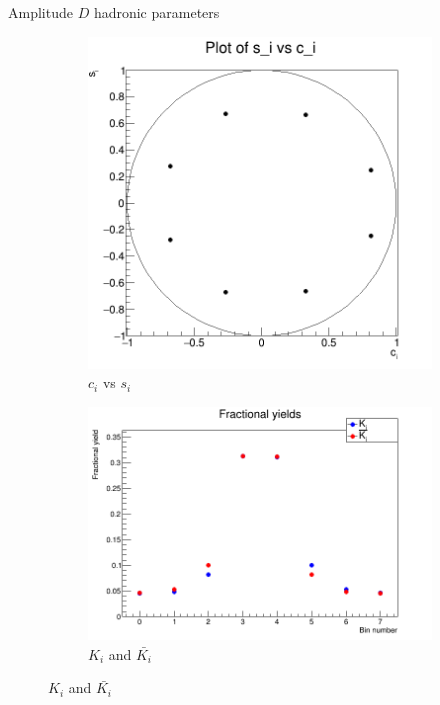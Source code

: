 \documentclass{beamer}
\begin{document}
\begin{frame}{Amplitude $D$ hadronic parameters}
  \begin{figure}
    \centering
    \vspace{-0.2cm}
    \begin{subfigure}{0.5\textwidth}
      \includegraphics[width = 1.0\textwidth]{Amplitude_8_cs.png}
      \caption{$c_i$ vs $s_i$}
    \end{subfigure}%
    \begin{subfigure}{0.5\textwidth}
      \includegraphics[width = 1.0\textwidth]{Amplitude_8_KKbar.png}
      \caption{$K_i$ and $\bar{K_i}$}
    \end{subfigure}
  \end{figure}
\end{frame}
\end{document}
